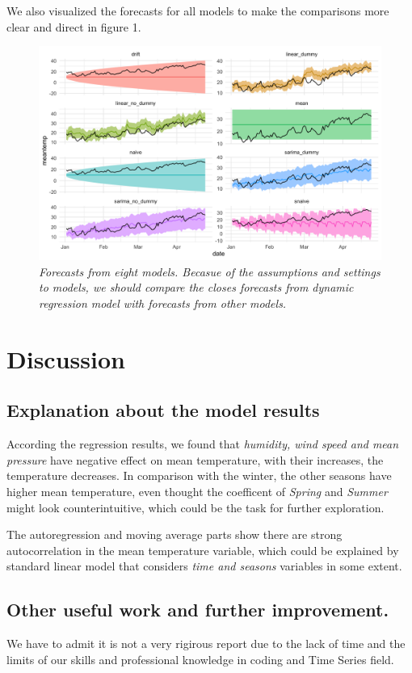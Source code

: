 \documentclass[12pt]{article}
\begin{document}
We also visualized the forecasts for all models to 
make the comparisons more clear and direct in figure 1.
\begin{figure}[!h]
    \centering
    \includegraphics[width=.8\textwidth]{images/forecasts_CI90.png}
    \captionsetup{font=small} %
    \caption{\textit{Forecasts from eight models. 
    Becasue of the assumptions and settings to models,
    we should compare the closes forecasts from dynamic regression model with forecasts
    from other models.}}
    \label{fig:figure1}
\end{figure}

\section{Discussion}
\subsection{Explanation about the model results}
According the regression results, we found that \textit{humidity, wind speed and mean pressure} have
negative effect on mean temperature, with their increases, the temperature decreases.
In comparison with the winter, the other seasons have higher mean temperature, 
even thought the coefficent of \textit{Spring} and \textit{Summer} might look counterintuitive, 
which could be the task for further exploration.

The autoregression and moving average parts show there are strong autocorrelation
in the mean temperature variable, which could be explained by standard linear model
that considers \textit{time and seasons} variables in some extent.

\subsection{Other useful work and further improvement.}
We have to admit it is not a very rigirous report due to the lack of time and 
the limits of our skills and professional knowledge in coding and Time Series field.
\end{document}
